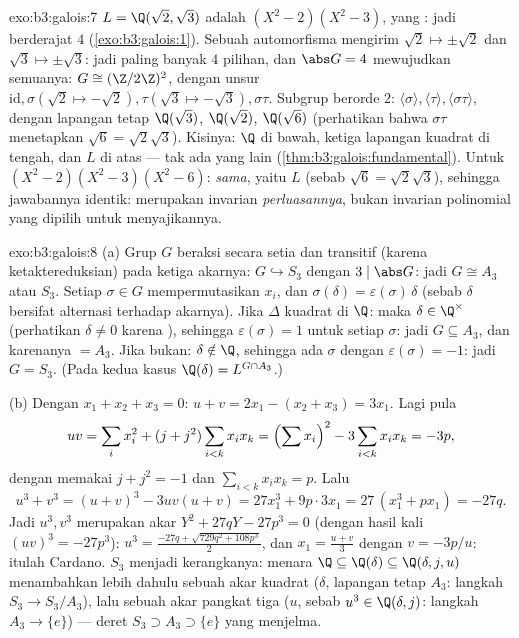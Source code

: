 \begin{solution}{exo:b3:galois:7}
$L = \Q(\sqrt2, \sqrt3)$ adalah  $(X^2 -
2)(X^2 - 3)$, yang : jadi  berderajat $4$
(\cref{exo:b3:galois:1}). Sebuah automorfisma mengirim $\sqrt2 \mapsto
\pm\sqrt2$ dan $\sqrt3 \mapsto \pm\sqrt3$: jadi paling banyak $4$ pilihan,
dan $\abs G = 4$ mewujudkan semuanya: $G \cong (\Z/2\Z)^2$, dengan
unsur $\mathrm{id}, \sigma (\sqrt2 \mapsto -\sqrt2), \tau
(\sqrt3\mapsto-\sqrt3), \sigma\tau$. Subgrup berorde $2$:
$\langle\sigma\rangle, \langle\tau\rangle,
\langle\sigma\tau\rangle$, dengan lapangan tetap $\Q(\sqrt3)$,
$\Q(\sqrt2)$, $\Q(\sqrt6)$ (perhatikan bahwa $\sigma\tau$ menetapkan $\sqrt6 =
\sqrt2\sqrt3$). Kisinya: $\Q$ di bawah, ketiga lapangan
kuadrat di tengah, dan $L$ di atas --- tak ada yang lain
(\cref{thm:b3:galois:fundamental}). Untuk $(X^2-2)(X^2-3)(X^2-6)$:
 \emph{sama}, yaitu $L$ (sebab $\sqrt6 =
\sqrt2\sqrt3$), sehingga jawabannya identik:  merupakan invarian \emph{perluasannya}, bukan invarian
polinomial yang dipilih untuk menyajikannya.
\end{solution}

\begin{solution}{exo:b3:galois:8}
(a) Grup $G$ beraksi secara setia dan transitif (karena ketaktereduksian) pada
ketiga akarnya: $G \hookrightarrow S_3$ dengan $3 \mid \abs G$: jadi $G
\cong A_3$ atau $S_3$. Setiap $\sigma \in G$ mempermutasikan $x_i$, dan
$\sigma(\delta) = \varepsilon(\sigma)\,\delta$ (sebab $\delta$ bersifat
alternasi terhadap akarnya). Jika $\Delta$ kuadrat di $\Q$: maka
$\delta \in \Q^\times$ (perhatikan $\delta \neq 0$ karena ), sehingga
$\varepsilon(\sigma) = 1$ untuk setiap $\sigma$: jadi $G \subseteq A_3$,
dan karenanya $= A_3$. Jika bukan: $\delta \notin \Q$, sehingga ada $\sigma$ dengan
$\varepsilon(\sigma) = -1$: jadi $G = S_3$. (Pada kedua kasus $\Q(\delta)
= L^{G \cap A_3}$.)

(b) Dengan $x_1 + x_2 + x_3 = 0$: $u + v = 2x_1 - (x_2 + x_3) =
3x_1$. Lagi pula
\[
uv = \sum_i x_i^2 + (j + j^2)\sum_{i<k}x_ix_k
= \Bigl(\sum x_i\Bigr)^2 - 3\sum_{i<k}x_ix_k = -3p,
\]
dengan memakai $j + j^2 = -1$ dan $\sum_{i<k}x_ix_k = p$. Lalu
\[
u^3 + v^3 = (u+v)^3 - 3uv(u+v) = 27x_1^3 + 9p\cdot 3x_1
= 27\,(x_1^3 + px_1) = -27q .
\]
Jadi $u^3, v^3$ merupakan akar $Y^2 + 27qY - 27p^3 = 0$
(dengan hasil kali $(uv)^3 = -27p^3$): $u^3 = \frac{-27q +
\sqrt{729q^2 + 108p^3}}2$, dan $x_1 = \frac{u + v}3$ dengan $v =
-3p/u$: itulah Cardano.  $S_3$ menjadi kerangkanya:
menara $\Q \subseteq \Q(\delta) \subseteq \Q(\delta, j, u)$
menambahkan lebih dahulu sebuah akar kuadrat ($\delta$, lapangan tetap $A_3$:
langkah $S_3 \to S_3/A_3$), lalu sebuah akar pangkat tiga ($u$, sebab $u^3
\in \Q(\delta, j)$: langkah $A_3 \to \{e\}$) --- deret
 $S_3 \supset A_3 \supset \{e\}$ yang menjelma.
\end{solution}

